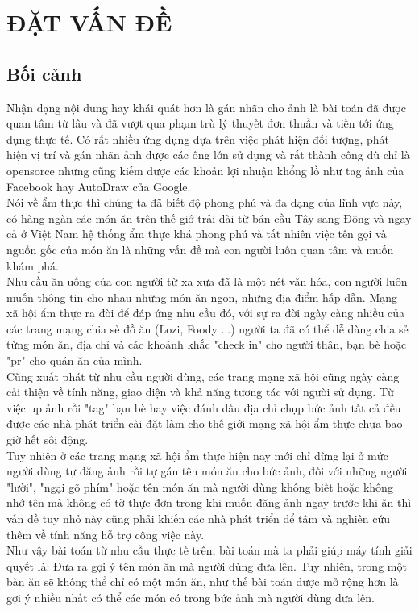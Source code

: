 \documentclass[13pt, a4paper]{extreport}
\begin{document}
\chapter{ĐẶT VẤN ĐỀ}
\section{Bối cảnh}
\indent Nhận dạng nội dung hay khái quát hơn là gán nhãn cho ảnh là bài toán đã được quan tâm từ lâu và đã vượt qua phạm trù lý thuyết đơn thuần và tiến tới ứng dụng thực tế. Có rất nhiều ứng dụng dựa trên việc phát hiện đối tượng, phát hiện vị trí và gán nhãn ảnh được các ông lớn sử dụng và rất thành công dù chỉ là opensorce nhưng cũng kiếm được các khoản lợi nhuận khổng lồ như tag ảnh của Facebook hay AutoDraw của Google.\\
\indent Nói về ẩm thực thì chúng ta đã biết độ phong phú và đa dạng của lĩnh vực này, có hàng ngàn các món ăn trên thế giớ trải dài từ bán cầu Tây sang Đông và ngay cả ở Việt Nam hệ thống ẩm thực khá phong phú và tất nhiên việc tên gọi và nguồn gốc của món ăn là những vấn đề mà con người luôn quan tâm và muốn khám phá. \\
\indent Nhu cầu ăn uống của con người từ xa xưa đã là một nét văn hóa, con người luôn muốn thông tin cho nhau những món ăn ngon, những địa điểm hấp dẫn. Mạng xã hội ẩm thực ra đời để đáp ứng nhu cầu đó, với sự ra đời ngày càng nhiều của các trang mạng chia sẻ đồ ăn (Lozi, Foody ...) người ta đã có thể dễ dàng chia sẻ từng món ăn, địa chỉ và các khoảnh khắc "check in" cho người thân, bạn bè hoặc "pr" cho quán ăn của mình.\\
\indent Cũng xuất phát từ nhu cầu người dùng, các trang mạng xã hội cũng ngày càng cải thiện về tính năng, giao diện và khả năng tương tác với người sử dụng. Từ việc up ảnh rồi "tag" bạn bè hay việc đánh dấu địa chỉ chụp bức ảnh tất cả đều được các nhà phát triển cài đặt làm cho thế giới mạng xã hội ẩm thực chưa bao giờ hết sôi động.\\
\indent Tuy nhiên ở các trang mạng xã hội ẩm thực hiện nay mới chỉ dừng lại ở mức người dùng tự đăng ảnh rồi tự gán tên món ăn cho bức ảnh, đối với những người "lười", "ngại gõ phím" hoặc tên món ăn mà người dùng không biết hoặc không nhớ tên mà không có tờ thực đơn trong khi muốn đăng ảnh ngay trước khi ăn thì vấn đề tuy nhỏ này cũng phải khiến các nhà phát triển để tâm và nghiên cứu thêm về tính năng hỗ trợ công việc này.\\
\indent Như vậy bài toán từ nhu cầu thực tế trên, bài toán mà ta phải giúp máy tính giải quyết là: Đưa ra gợi ý tên món ăn mà người dùng đưa lên. Tuy nhiên, trong một bàn ăn sẽ không thể chỉ có một món ăn, như thế bài toán được mở rộng hơn là gợi ý nhiều nhất có thể các món có trong bức ảnh mà người dùng đưa lên.
\end{document}
